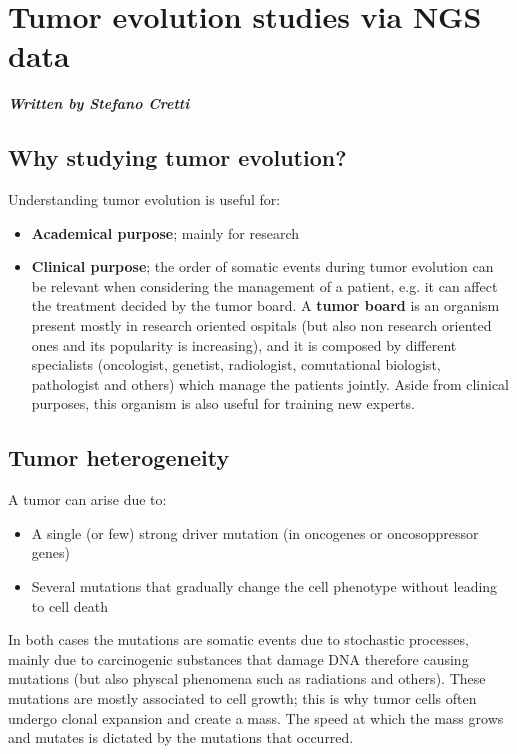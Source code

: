 \graphicspath{{chapters/TumorEvAndVesciclesImages/}}


\chapter{Tumor evolution studies via NGS data}

\textbf{\textit{Written by Stefano Cretti}}


\section{Why studying tumor evolution?}

  Understanding tumor evolution is useful for: 
  \begin{itemize}
    \item \textbf{Academical purpose}; mainly for research
    \item \textbf{Clinical purpose}; the order of somatic events during tumor evolution can be relevant when considering the management of a patient, e.g. it can affect the treatment decided by the tumor board. A \textbf{tumor board} is an organism present mostly in research oriented ospitals (but also non research oriented ones and its popularity is increasing), and it is composed by different specialists (oncologist, genetist, radiologist, comutational biologist, pathologist and others) which manage the patients jointly. Aside from clinical purposes, this organism is also useful for training new experts. 
  \end{itemize}


\section{Tumor heterogeneity}
  
  A tumor can arise due to:
  \begin{itemize}
    \item A single (or few) strong driver mutation (in oncogenes or oncosoppressor genes)
    \item Several mutations that gradually change the cell phenotype without leading to cell death
  \end{itemize}
  In both cases the mutations are somatic events due to stochastic processes, mainly due to carcinogenic substances that damage DNA therefore causing mutations (but also physcal phenomena such as radiations and others). These mutations are mostly associated to cell growth; this is why tumor cells often undergo clonal expansion and create a mass. The speed at which the mass grows and mutates is dictated by the mutations that occurred. 
  
